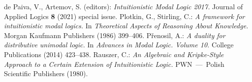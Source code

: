 \documentclass[draft]{article}
\begin{document}
\begin{thebibliography}{}
%
%
%
%
de Paiva, V., Artemov, S. (editors):
{\it Intuitionistic Modal Logic 2017.}
Journal of Applied Logics {\bf 8} (2021) special issue.
%
%
%
%
%
%
%
%
%
%
%
%
Plotkin, G., Stirling, C.:
{\it A framework for intuitionistic modal logics.}
In {\it Theoretical Aspects of Reasoning About Knowledge.}
Morgan Kaufmann Publishers (1986) 399--406.
%
%
%
%
P\v{r}enosil, A.:
{\it A duality for distributive unimodal logic.}
In {\it Advances in Modal Logic.
Volume 10.}
College Publications (2014) 423--438.
%
%
%
%
%
%
%
%
Rauszer, C.:
{\it An Algebraic and Kripke-Style Approach to a Certain Extension of Intuitionistic Logic.}
PWN~---~Polish Scientific Publishers (1980).

\end{thebibliography}
\end{document}
